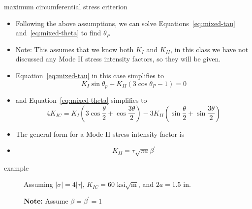 \documentclass[10pt]{beamer}
\begin{document}
\begin{frame}{maximum circumferential stress criterion}
	\begin{itemize}[<+->]
		\item Following the above assumptions, we can solve Equations~\ref{eq:mixed-tau} and~\ref{eq:mixed-theta} to find $\theta_P$
		\item Note: This assumes that we know both $K_I$ and $K_{II}$, in this class we have not discussed any Mode II stress intensity factors, so they will be given.
		\item Equation~\ref{eq:mixed-tau} in this case simplifies to
		\begin{equation}
		K_I \sin \theta_p + K_{II} (3\cos \theta_P -1) = 0
		\end{equation}
		\item and Equation~\ref{eq:mixed-theta} simplifies to
		\begin{equation}
		4K_{IC} = K_I\left(3\cos \frac{\theta}{2} + \cos \frac{3\theta}{2}\right) - 3K_{II}\left(\sin \frac{\theta}{2} + \sin \frac{3\theta}{2}\right)
		\end{equation}
		\item The general form for a Mode II stress intensity factor is
		\item[]
		\begin{equation}
		K_{II} = \tau \sqrt{\pi a} \beta^\prime
		\end{equation}
	\end{itemize}
\end{frame}

\begin{frame}{example}
	\begin{figure}[H]
		Assuming $|\sigma| = 4|\tau|$, $K_{IC} = 60 \text{ ksi} \sqrt{\text{in}}$, and $2a = 1.5 \text{ in}$.
		
		\textbf{Note:} Assume $\beta = \beta^\prime = 1$
		
		\centering
	\end{figure}
\end{frame}
\end{document}
